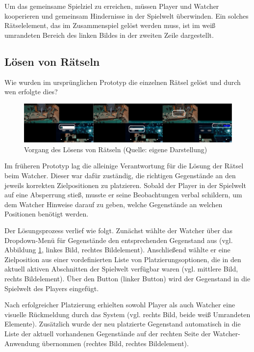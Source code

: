 Um das gemeinsame Spielziel zu erreichen, müssen Player und Watcher kooperieren und gemeinsam Hindernisse in der Spielwelt überwinden. Ein solches Rätselelement, das im Zusammenspiel gelöst werden muss, ist im weiß umrandeten Bereich des linken Bildes in der zweiten Zeile dargestellt.

\subsection{Lösen von Rätseln}

Wie wurden im ursprünglichen Prototyp die einzelnen Rätsel gelöst und durch wen erfolgte dies?

\begin{figure}[ht]
\centering
\includegraphics[width=1\linewidth]{content/pictures/HowToSolve.png}
\caption{Vorgang des Lösens von Rätseln (Quelle: eigene Darstellung)}
\label{fig:old-solving-riddle}
\end{figure}

Im früheren Prototyp lag die alleinige Verantwortung für die Lösung der Rätsel beim Watcher. Dieser war dafür zuständig, die richtigen Gegenstände an den jeweils korrekten Zielpositionen zu platzieren. Sobald der Player in der Spielwelt auf eine Absperrung stieß, musste er seine Beobachtungen verbal schildern, um dem Watcher Hinweise darauf zu geben, welche Gegenstände an welchen Positionen benötigt werden.

Der Lösungsprozess verlief wie folgt. Zunächst wählte der Watcher über das Dropdown-Menü für Gegenstände den entsprechenden Gegenstand aus (vgl. Abbildung \ref{fig:old-solving-riddle}, linkes Bild, rechtes Bildelement). Anschließend wählte er eine Zielposition aus einer vordefinierten Liste von Platzierungsoptionen, die in den aktuell aktiven Abschnitten der Spielwelt verfügbar waren (vgl. mittlere Bild, rechts Bildelement). Über den Button  (linker Button) wird der Gegenstand in die Spielwelt des Players eingefügt.

Nach erfolgreicher Platzierung erhielten sowohl Player als auch Watcher eine visuelle Rückmeldung durch das System (vgl. rechts Bild, beide weiß Umrandeten Elemente). Zusätzlich wurde der neu platzierte Gegenstand automatisch in die Liste der aktuell vorhandenen Gegenstände auf der rechten Seite der Watcher-Anwendung übernommen (rechtes Bild, rechtes Bildelement). 

